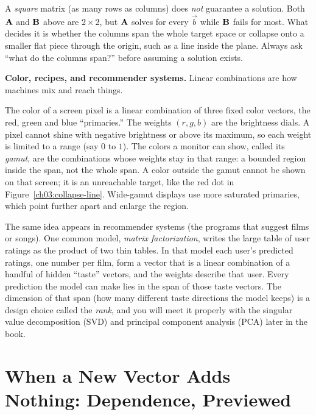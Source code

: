 \begin{trapbox}
A \emph{square} matrix (as many rows as columns) does \emph{not} guarantee a solution. Both $\mathbf{A}$ and $\mathbf{B}$ above are $2\times 2$, but $\mathbf{A}$ solves for every $\vec{b}$ while $\mathbf{B}$ fails for most. What decides it is whether the columns span the whole target space or collapse onto a smaller flat piece through the origin, such as a line inside the plane. Always ask ``what do the columns span?'' before assuming a solution exists.
\end{trapbox}

\begin{applicationbox}
\textbf{Color, recipes, and recommender systems.} Linear combinations are how machines mix and reach things.

The color of a screen pixel is a linear combination of three fixed color vectors, the red, green and blue ``primaries.'' The weights $(r,g,b)$ are the brightness dials. A pixel cannot shine with negative brightness or above its maximum, so each weight is limited to a range (say $0$ to $1$). The colors a monitor can show, called its \emph{gamut}, are the combinations whose weights stay in that range: a bounded region inside the span, not the whole span. A color outside the gamut cannot be shown on that screen; it is an unreachable target, like the red dot in Figure~\ref{ch03:collapse-line}. Wide-gamut displays use more saturated primaries, which point further apart and enlarge the region.

The same idea appears in recommender systems (the programs that suggest films or songs). One common model, \emph{matrix factorization}, writes the large table of user ratings as the product of two thin tables. In that model each user's predicted ratings, one number per film, form a vector that is a linear combination of a handful of hidden ``taste'' vectors, and the weights describe that user. Every prediction the model can make lies in the span of those taste vectors. The dimension of that span (how many different taste directions the model keeps) is a design choice called the \emph{rank}, and you will meet it properly with the singular value decomposition (SVD) and principal component analysis (PCA) later in the book.
\end{applicationbox}

\section{When a New Vector Adds Nothing: Dependence, Previewed}

